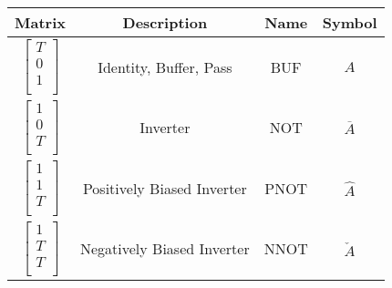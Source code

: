 \documentclass[12pt]{article}
\begin{document}
\begin{figure}[h]
    \centering
    \begin{tabular}{c|c|c|c}
        Matrix & Description & Name & Symbol \\
        \hline
        $\begin{bmatrix}T \\ 0 \\ 1 \\\end{bmatrix}$ & Identity, Buffer, Pass & BUF & $A$ \\
        $\begin{bmatrix}1 \\ 0 \\ T \\\end{bmatrix}$ & Inverter & NOT & $\overline{A}$ \\
        $\begin{bmatrix}1 \\ 1 \\ T \\\end{bmatrix}$ & Positively Biased Inverter & PNOT & $\hat{A}$ \\
        $\begin{bmatrix}1 \\ T \\ T \\\end{bmatrix}$ & Negatively Biased Inverter & NNOT & $\check{A}$ \\

\end{tabular}
\end{figure}
\end{document}
